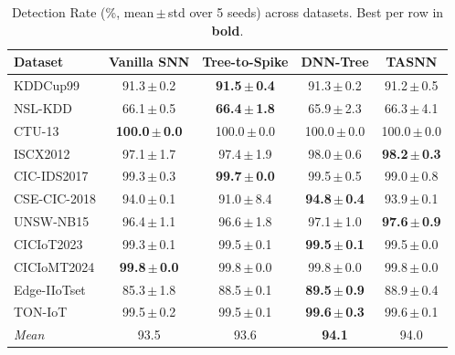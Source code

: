 \begin{table}[t]
\centering
\caption{Detection Rate (\%, mean\,$\pm$\,std over 5 seeds) across datasets. Best per row in \textbf{bold}.}
\label{tab:DR}
\footnotesize
\setlength{\tabcolsep}{4pt}
\begin{tabular}{lcccc}
\toprule
Dataset & Vanilla SNN & Tree-to-Spike & DNN-Tree & TASNN \\
\midrule
KDDCup99 & 91.3\,$\pm$\,0.2 & \textbf{91.5\,$\pm$\,0.4} & 91.3\,$\pm$\,0.2 & 91.2\,$\pm$\,0.5 \\
NSL-KDD & 66.1\,$\pm$\,0.5 & \textbf{66.4\,$\pm$\,1.8} & 65.9\,$\pm$\,2.3 & 66.3\,$\pm$\,4.1 \\
CTU-13 & \textbf{100.0\,$\pm$\,0.0} & 100.0\,$\pm$\,0.0 & 100.0\,$\pm$\,0.0 & 100.0\,$\pm$\,0.0 \\
ISCX2012 & 97.1\,$\pm$\,1.7 & 97.4\,$\pm$\,1.9 & 98.0\,$\pm$\,0.6 & \textbf{98.2\,$\pm$\,0.3} \\
CIC-IDS2017 & 99.3\,$\pm$\,0.3 & \textbf{99.7\,$\pm$\,0.0} & 99.5\,$\pm$\,0.5 & 99.0\,$\pm$\,0.8 \\
CSE-CIC-2018 & 94.0\,$\pm$\,0.1 & 91.0\,$\pm$\,8.4 & \textbf{94.8\,$\pm$\,0.4} & 93.9\,$\pm$\,0.1 \\
UNSW-NB15 & 96.4\,$\pm$\,1.1 & 96.6\,$\pm$\,1.8 & 97.1\,$\pm$\,1.0 & \textbf{97.6\,$\pm$\,0.9} \\
CICIoT2023 & 99.3\,$\pm$\,0.1 & 99.5\,$\pm$\,0.1 & \textbf{99.5\,$\pm$\,0.1} & 99.5\,$\pm$\,0.0 \\
CICIoMT2024 & \textbf{99.8\,$\pm$\,0.0} & 99.8\,$\pm$\,0.0 & 99.8\,$\pm$\,0.0 & 99.8\,$\pm$\,0.0 \\
Edge-IIoTset & 85.3\,$\pm$\,1.8 & 88.5\,$\pm$\,0.1 & \textbf{89.5\,$\pm$\,0.9} & 88.9\,$\pm$\,0.4 \\
TON-IoT & 99.5\,$\pm$\,0.2 & 99.5\,$\pm$\,0.1 & \textbf{99.6\,$\pm$\,0.3} & 99.6\,$\pm$\,0.1 \\
\midrule
\textit{Mean} & 93.5 & 93.6 & \textbf{94.1} & 94.0 \\
\bottomrule
\end{tabular}
\end{table}
